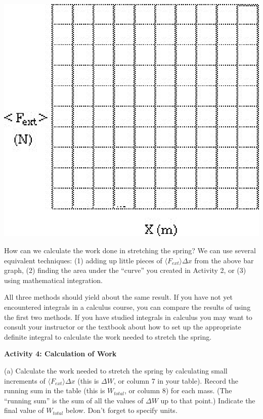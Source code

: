 \vspace{0.3cm}
{\par\centering \includegraphics{work_kinetic_fig2.eps} \par}
\vspace{0.3cm}

How can we calculate the work done in stretching the spring? We can use several
equivalent techniques: (1) adding up little pieces of \( \langle F_{ext} 
\rangle \Delta x \) from the above bar graph,
(2) finding the area under the ``curve'' you created in Activity 2, or (3)
using mathematical integration.

All three methods should yield about the same result. If you have not yet encountered
integrals in a calculus course, you can compare the results of using the first
two methods. If you have studied integrals in calculus you may want to consult
your instructor or the textbook about how to set up the appropriate definite
integral to calculate the work needed to stretch the spring. 

\textbf{Activity 4: Calculation of Work }

(a) Calculate the work needed to stretch the spring by calculating small increments of \( \langle F_{ext} \rangle \Delta  x\) (this is \( \Delta W\), or column 7 in your table). Record the running sum in the table (this is \( W_{total} \), or column 8) for each mass. (The ``running sum'' is the sum of all the values of \( \Delta W\) up to that point.) Indicate the final value of \( W_{total} \) below. Don't forget to specify units.
\vspace{5mm}

